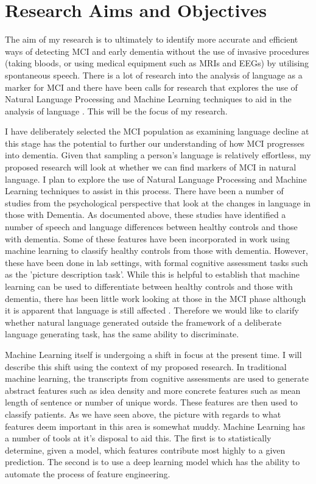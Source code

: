 \documentclass[10pt, letterpaper, twoside, openany]{book}
\begin{document}
\section{Research Aims and Objectives}
The aim of my research is to ultimately to identify more accurate and efficient ways of detecting MCI and early dementia without the use of invasive procedures (taking bloods, or using medical equipment such as MRIs and EEGs) by utilising spontaneous speech. There is a lot of research into the analysis of language as a marker for MCI \cite{Taler2008, Boschi2017} and there have been calls for research that explores the use of Natural Language Processing and Machine Learning techniques to aid in the analysis of language \cite{Boschi2017}. This will be the focus of my research.
\par
I have deliberately selected the MCI population as examining language decline at this stage has the potential to further our understanding of how MCI progresses into dementia. Given that sampling a person's language is relatively effortless, my proposed research will look at whether we can find markers of MCI in natural language. I plan to explore the use of Natural Language Processing and Machine Learning techniques to assist in this process. There have been a number of studies from the psychological perspective that look at the changes in language in those with Dementia. As documented above, these studies have identified a number of speech and language differences between healthy controls and those with dementia. Some of these features have been incorporated in work using machine learning to classify healthy controls from those with dementia. However, these have been done in lab settings, with formal cognitive assessment tasks such as the 'picture description task'. While this is helpful to establish that machine learning can be used to differentiate between healthy controls and those with dementia, there has been little work looking at those in the MCI phase although it is apparent that language is still affected \cite{Berisha2015, Snowdon1996, Le2011}. Therefore we would like to clarify whether natural language generated outside the framework of a deliberate language generating task, has the same ability to discriminate.
\par
Machine Learning itself is undergoing a shift in focus at the present time. I will describe this shift using the context of my proposed research. In traditional machine learning, the transcripts from cognitive assessments are used to generate abstract features such as idea density and more concrete features such as mean length of sentence or number of unique words. These features are then used to classify patients. As we have seen above, the picture with regards to what features deem important in this area is somewhat muddy. Machine Learning has a number of tools at it's disposal to aid this. The first is to statistically determine, given a model, which features contribute most highly to a given prediction. The second is to use a deep learning model which has the ability to automate the process of feature engineering. 
\end{document}
